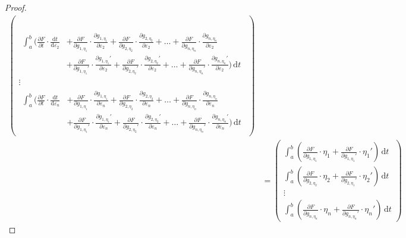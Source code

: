 \documentclass[12pt,a4paper]{article}
\begin{document}
\begin{proof}
\begin{align*}
\begin{pmatrix}
\begin{split}
\end{split}\\
\displaystyle\begin{split}
\int_a^b\biggl(\frac{\partial F}{\partial t}\cdot\frac{\mathrm{d}t}{\mathrm{d}\varepsilon_2}&+\frac{\partial F}{\partial g_{1,\eta_1}}\cdot\frac{\partial g_{1,\eta_1}}{\partial\varepsilon_2}+\frac{\partial F}{\partial g_{2,\eta_2}}\cdot\frac{\partial g_{2,\eta_2}}{\partial\varepsilon_2}+\dots+\frac{\partial F}{\partial g_{n,\eta_n}}\cdot\frac{\partial g_{n,\eta_n}}{\partial\varepsilon_2}\\
&+\frac{\partial F}{\partial {g_{1,\eta_1}}'}\cdot\frac{\partial {g_{1,\eta_1}}'}{\partial\varepsilon_2}+\frac{\partial F}{\partial {g_{2,\eta_2}}'}\cdot\frac{\partial {g_{2,\eta_2}}'}{\partial\varepsilon_2}+\dots+\frac{\partial F}{\partial {g_{n,\eta_n}}'}\cdot\frac{\partial {g_{n,\eta_n}}'}{\partial\varepsilon_2}\biggr)\,\mathrm{d}t
\end{split}\\
\vdots\\
\displaystyle\begin{split}
\int_a^b\biggl(\frac{\partial F}{\partial t}\cdot\frac{\mathrm{d}t}{\mathrm{d}\varepsilon_n}&+\frac{\partial F}{\partial g_{1,\eta_1}}\cdot\frac{\partial g_{1,\eta_1}}{\partial\varepsilon_n}+\frac{\partial F}{\partial g_{2,\eta_2}}\cdot\frac{\partial g_{2,\eta_2}}{\partial\varepsilon_n}+\dots+\frac{\partial F}{\partial g_{n,\eta_n}}\cdot\frac{\partial g_{n,\eta_n}}{\partial\varepsilon_n}\\
&+\frac{\partial F}{\partial {g_{1,\eta_1}}'}\cdot\frac{\partial {g_{1,\eta_1}}'}{\partial\varepsilon_n}+\frac{\partial F}{\partial {g_{2,\eta_2}}'}\cdot\frac{\partial {g_{2,\eta_2}}'}{\partial\varepsilon_n}+\dots+\frac{\partial F}{\partial {g_{n,\eta_n}}'}\cdot\frac{\partial {g_{n,\eta_n}}'}{\partial\varepsilon_n}\biggr)\,\mathrm{d}t
\end{split}
\end{pmatrix}\\
&=\begin{pmatrix}
\displaystyle\int_a^b\left(\frac{\partial F}{\partial g_{1,\eta_1}}\cdot\eta_1+\frac{\partial F}{\partial {g_{1,\eta_1}}'}\cdot{\eta_1}'\right)\,\mathrm{d}t\\
\displaystyle\int_a^b\left(\frac{\partial F}{\partial g_{2,\eta_2}}\cdot\eta_2+\frac{\partial F}{\partial {g_{2,\eta_1}}'}\cdot{\eta_2}'\right)\,\mathrm{d}t\\
\vdots\\
\displaystyle\int_a^b\left(\frac{\partial F}{\partial g_{n,\eta_n}}\cdot\eta_n+\frac{\partial F}{\partial {g_{n,\eta_n}}'}\cdot{\eta_n}'\right)\,\mathrm{d}t

\end{pmatrix}
\end{align*}
\end{proof}
\end{document}
